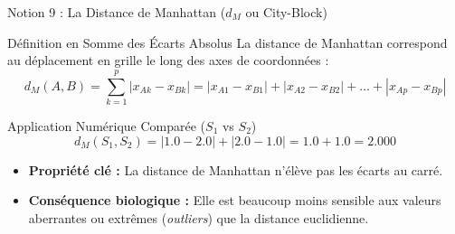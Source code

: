 \documentclass[aspectratio=169,10pt]{beamer}
\begin{document}
\begin{frame}{Notion 9 : La Distance de Manhattan ($d_M$ ou City-Block)}
  \begin{conceptbox}{Définition en Somme des Écarts Absolus}
    \footnotesize
    La distance de Manhattan correspond au déplacement en grille le long des axes de coordonnées :
    \begin{equation*}
      d_M(A, B) = \sum_{k=1}^p |x_{Ak} - x_{Bk}| = |x_{A1} - x_{B1}| + |x_{A2} - x_{B2}| + \dots + |x_{Ap} - x_{Bp}|
    \end{equation*}
  \end{conceptbox}
  \vspace{1mm}
  \begin{biobox}{Application Numérique Comparée ($S_1$ vs $S_2$)}
    \footnotesize
    \begin{equation*}
      d_M(S_1, S_2) = |1.0 - 2.0| + |2.0 - 1.0| = 1.0 + 1.0 = \mathbf{2.000}
    \end{equation*}
    \begin{itemize}
      \item \textbf{Propriété clé :} La distance de Manhattan n'élève pas les écarts au carré.
      \item \textbf{Conséquence biologique :} Elle est beaucoup moins sensible aux valeurs aberrantes ou extrêmes (\textit{outliers}) que la distance euclidienne.
    \end{itemize}
  \end{biobox}
\end{frame}
\end{document}
